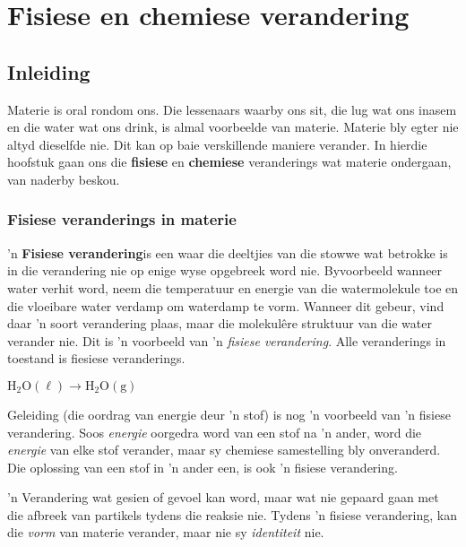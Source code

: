          \chapter{Fisiese en chemiese verandering}
    \label{m38709*cid1}
            \section{Inleiding}
            \nopagebreak


      \label{m38709*id62175}Materie is oral rondom ons. Die lessenaars waarby ons sit, die lug wat ons inasem en die water wat ons drink, is almal
voorbeelde van materie. Materie bly egter nie altyd dieselfde nie. Dit kan op baie verskillende
maniere verander. In hierdie hoofstuk gaan ons die \textbf{fisiese} en \textbf{chemiese} veranderings wat materie ondergaan, van naderby
beskou.\par 
{}
    \label{m38709*cid2}
            \subsection*{Fisiese veranderings in materie}
            \nopagebreak
      \label{m38709*id62200} 'n \textbf{Fisiese verandering}is een waar die deeltjies van die stowwe wat betrokke is in die verandering
nie op enige wyse opgebreek word nie. Byvoorbeeld wanneer water verhit word, neem die temperatuur en energie van
die watermolekule toe en die vloeibare water verdamp om waterdamp te vorm. Wanneer dit gebeur, vind daar  'n soort
verandering plaas, maar die molekulêre struktuur van die water verander nie. Dit is 'n voorbeeld van 'n \textsl{fisiese verandering}. Alle veranderings in toestand is fiesiese veranderings. \par 
      \label{m38709*id62556}$\text{H}{}_{2}\text{O}\left( \ell \right)\to \text{H}{}_{2}\text{O}\left(\text{g}\right)$
      \par 
      \label{m38709*id62600}Geleiding (die oordrag van energie deur 'n stof) is nog 'n voorbeeld van 'n fisiese verandering. Soos \textsl{energie} oorgedra word van een stof na 'n ander, word die \textsl{energie} van elke stof verander, maar sy chemiese samestelling bly onveranderd. Die oplossing van een stof in 'n ander een, is ook 'n fisiese verandering.\par 
\label{m38709*fhsst!!!underscore!!!id76}
  { \label{m38709*meaningfhsst!!!underscore!!!id76}
      'n Verandering wat gesien of gevoel kan word, maar wat nie gepaard gaan met die afbreek van partikels tydens die
reaksie nie. Tydens 'n fisiese verandering, kan die \textsl{vorm} van materie verander, maar nie sy \textsl{identiteit} nie. 
       } 

